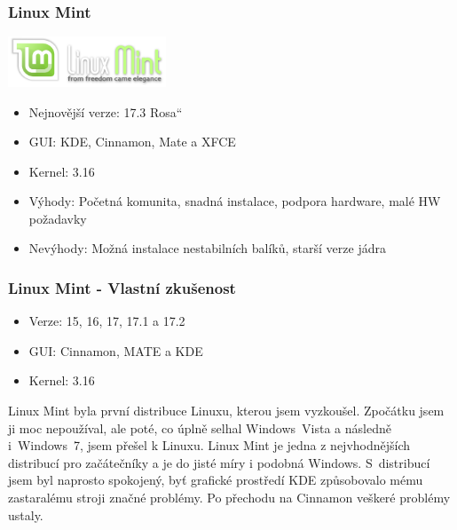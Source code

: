 \documentclass{beamer}
\newcommand{\czuv}[1]{\quotedblbase #1\textquotedblleft}
\begin{document}
  \begin{frame}
    \frametitle{Linux Mint}
    \includegraphics[height=1.5cm]{mint.png}
      \begin{itemize}
	\item Nejnovější verze: 17.3 \czuv{Rosa}
	\item GUI: KDE, Cinnamon, Mate a XFCE
	\item Kernel: 3.16
	\item Výhody: Početná komunita, snadná instalace, podpora hardware, malé HW požadavky
	\item Nevýhody: Možná instalace nestabilních balíků, starší verze jádra
      \end{itemize}
  \end{frame}
  \begin{frame}
    \frametitle{Linux Mint - Vlastní zkušenost}
      \begin{itemize}
	\item Verze: 15, 16, 17, 17.1 a 17.2
	\item GUI: Cinnamon, MATE a KDE
	\item Kernel: 3.16
      \end{itemize}
      Linux Mint byla první distribuce Linuxu, kterou jsem vyzkoušel. Zpočátku jsem ji moc nepoužíval,
      ale poté, co úplně selhal Windows~Vista a následně i~Windows~7, jsem přešel k
      Linuxu. Linux Mint je jedna z nejvhodnějších distribucí pro začátečníky a
      je do jisté míry i podobná Windows. S~distribucí jsem byl naprosto spokojený,
      byť grafické prostředí KDE způsobovalo mému zastaralému stroji značné problémy.
      Po přechodu na Cinnamon veškeré problémy ustaly.
  \end{frame}
\end{document}
